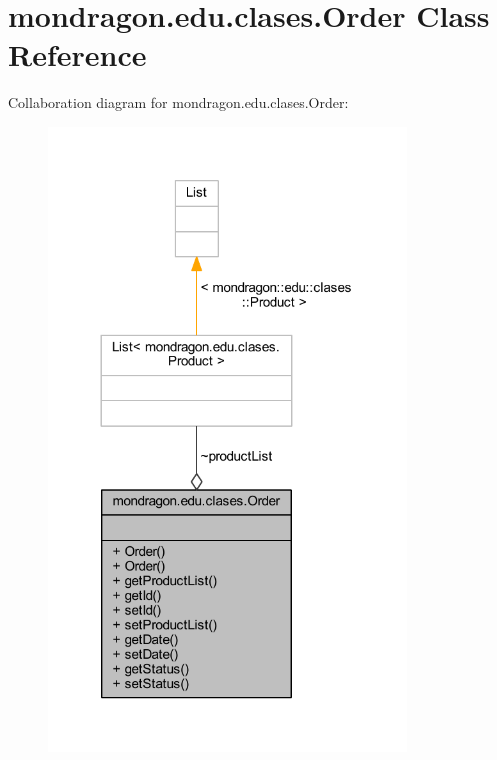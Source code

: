 \hypertarget{classmondragon_1_1edu_1_1clases_1_1_order}{}\section{mondragon.\+edu.\+clases.\+Order Class Reference}
\label{classmondragon_1_1edu_1_1clases_1_1_order}


Collaboration diagram for mondragon.\+edu.\+clases.\+Order\+:
\nopagebreak
\begin{figure}[H]
\begin{center}
\leavevmode
\includegraphics[width=269pt]{classmondragon_1_1edu_1_1clases_1_1_order__coll__graph}
\end{center}
\end{figure}
